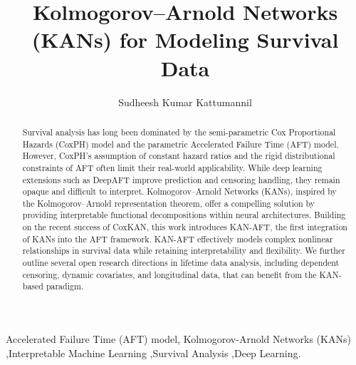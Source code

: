 \documentclass[preprint,11pt,authoryear]{elsarticle}
\begin{document}
\begin{frontmatter}

\title{\textbf{Kolmogorov–Arnold Networks (KANs) for Modeling Survival Data}}

\author{Sudheesh Kumar Kattumannil}

\address{Applied Statistics Unit, Indian Statistical Institute, Chennai, India.}

\begin{abstract}
Survival analysis has long been dominated by the semi-parametric Cox Proportional Hazards (CoxPH) model and the parametric Accelerated Failure Time (AFT) model. However, CoxPH’s assumption of constant hazard ratios and the rigid distributional constraints of AFT often limit their real-world applicability. While deep learning extensions such as DeepAFT improve prediction and censoring handling, they remain opaque and difficult to interpret. Kolmogorov–Arnold Networks (KANs), inspired by the Kolmogorov–Arnold representation theorem, offer a compelling solution by providing interpretable functional decompositions within neural architectures. Building on the recent success of CoxKAN, this work introduces KAN-AFT, the first integration of KANs into the AFT framework. KAN-AFT effectively models complex nonlinear relationships in survival data while retaining interpretability and flexibility. We further outline several open research directions in lifetime data analysis, including dependent censoring, dynamic covariates, and longitudinal data, that can benefit from the KAN-based paradigm.

\end{abstract}

\begin{keyword}
Accelerated Failure Time (AFT) model, Kolmogorov-Arnold Networks (KANs) \sep Interpretable Machine Learning \sep Survival Analysis \sep Deep Learning. 
\end{keyword}
\end{frontmatter}
\end{document}
